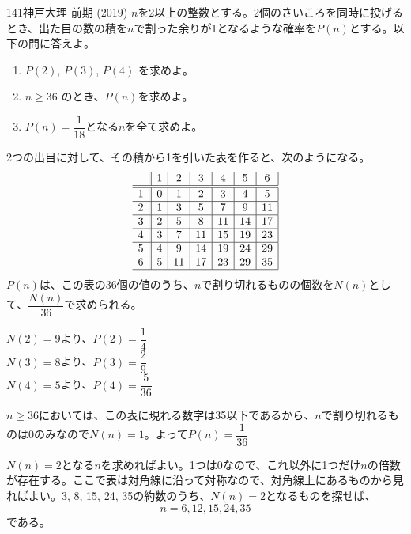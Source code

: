 \begin{prob}{141}{}{神戸大理 前期 (2019)}
 $n$を2以上の整数とする。2個のさいころを同時に投げるとき、出た目の数の積を$n$で割った余りが1となるような確率を$P(n)$とする。以下の問に答えよ。
 \begin{enumerate}
  \item $P(2)$, $P(3)$, $P(4)$ を求めよ。
  \item $n\ge 36$ のとき、$P(n)$を求めよ。
  \item $P(n)=\dfrac{1}{18}$となる$n$を全て求めよ。
 \end{enumerate}
\end{prob}
2つの出目に対して、その積から1を引いた表を作ると、次のようになる。
\begin{align*}
 \begin{array}{c||c|c|c|c|c|c|}
    & 1 & 2 & 3 & 4 & 5 & 6 \\ \hline\hline
  1 & 0 & 1 & 2 & 3 & 4 & 5 \\ \hline
  2 & 1 & 3 & 5 & 7 & 9 & 11\\ \hline
  3 & 2 & 5 & 8 & 11& 14& 17\\ \hline
  4 & 3 & 7 & 11& 15& 19& 23\\ \hline
  5 & 4 & 9 & 14& 19& 24& 29\\ \hline
  6 & 5 & 11& 17& 23& 29& 35\\ \hline
 \end{array}
\end{align*}
$P(n)$は、この表の36個の値のうち、$n$で割り切れるものの個数を$N(n)$として、$\dfrac{N(n)}{36}$で求められる。

$N(2)=9$より、$P(2)=\dfrac{1}{4}$ \\
$N(3)=8$より、$P(3)=\dfrac{2}{9}$ \\
$N(4)=5$より、$P(4)=\dfrac{5}{36}$

$n\ge 36$においては、この表に現れる数字は35以下であるから、$n$で割り切れるものは0のみなので$N(n)=1$。よって$P(n)=\dfrac{1}{36}$

$N(n)=2$となる$n$を求めればよい。1つは0なので、これ以外に1つだけ$n$の倍数が存在する。ここで表は対角線に沿って対称なので、対角線上にあるものから見ればよい。3, 8, 15, 24, 35の約数のうち、$N(n)=2$となるものを探せば、
\[ n=6, 12, 15, 24, 35 \]
である。